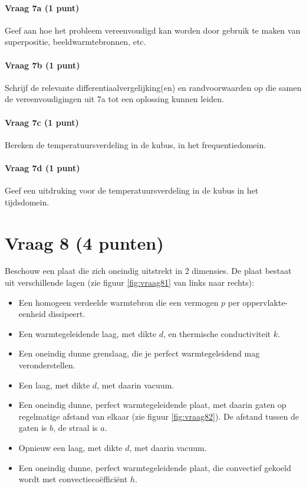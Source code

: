 \documentclass[a4paper]{article}
\begin{document}
\paragraph{Vraag 7a (1 punt)}
Geef aan hoe het probleem vereenvoudigd kan worden door gebruik te maken van superpositie, beeldwarmtebronnen, etc.

\paragraph{Vraag 7b (1 punt)}
Schrijf de relevante differentiaalvergelijking(en) en randvoorwaarden op die samen de vereenvoudigingen uit 7a tot een oplossing kunnen leiden.

\paragraph{Vraag 7c (1 punt)}
Bereken de temperatuursverdeling in de kubus, in het frequentiedomein.

\paragraph{Vraag 7d (1 punt)}
Geef een uitdruking voor de temperatuursverdeling in de kubus in het tijdsdomein.

\section*{Vraag 8 (4 punten)}
Beschouw een plaat die zich oneindig uitstrekt in 2 dimensies. De plaat bestaat uit verschillende lagen (zie figuur \ref{fig:vraag81} van links naar rechts):
\begin{itemize}
    \item Een homogeen verdeelde warmtebron die een vermogen $p$ per oppervlakte-eenheid dissipeert.
    \item Een warmtegeleidende laag, met dikte $d$, en thermische conductiviteit $k$.
    \item Een oneindig dunne grenslaag, die je perfect warmtegeleidend mag veronderstellen.
    \item Een laag, met dikte $d$, met daarin vacuum.
    \item Een oneindig dunne, perfect warmtegeleidende plaat, met daarin gaten op regelmatige afstand van elkaar (zie figuur \ref{fig:vraag82}). De afstand tussen de gaten is $b$, de straal is $a$.
    \item Opnieuw een laag, met dikte $d$, met daarin vacuum.
    \item Een oneindig dunne, perfect warmtegeleidende plaat, die convectief gekoeld wordt met convectiecoëfficiënt $h$.
\end{itemize}
\end{document}
